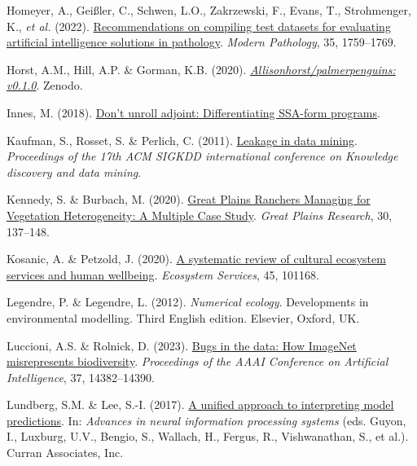 \documentclass[
  letterpaper,
]{scrbook}
\newlength{\cslhangindent}
\newenvironment{CSLReferences}[2] %
 {\begin{list}{}{%
  \setlength{\itemindent}{0pt}
  \setlength{\leftmargin}{0pt}
  \setlength{\parsep}{0pt}
  \ifodd #1
   \setlength{\leftmargin}{\cslhangindent}
   \setlength{\itemindent}{-1\cslhangindent}
  \fi
  \setlength{\itemsep}{#2\baselineskip}}}
 {\end{list}}
\begin{document}
\begin{CSLReferences}{1}{0}
Homeyer, A., Geißler, C., Schwen, L.O., Zakrzewski, F., Evans, T.,
Strohmenger, K., \emph{et al.} (2022).
\href{https://doi.org/10.1038/s41379-022-01147-y}{Recommendations on
compiling test datasets for evaluating artificial intelligence solutions
in pathology}. \emph{Modern Pathology}, 35, 1759--1769.

Horst, A.M., Hill, A.P. \& Gorman, K.B. (2020).
\emph{\href{https://doi.org/10.5281/ZENODO.3960218}{Allisonhorst/palmerpenguins:
v0.1.0}}. Zenodo.

Innes, M. (2018). \href{https://doi.org/10.48550/ARXIV.1810.07951}{Don't
unroll adjoint: Differentiating SSA-form programs}.

Kaufman, S., Rosset, S. \& Perlich, C. (2011).
\href{https://doi.org/10.1145/2020408.2020496}{Leakage in data mining}.
\emph{Proceedings of the 17th ACM SIGKDD international conference on
Knowledge discovery and data mining}.

Kennedy, S. \& Burbach, M. (2020).
\href{https://doi.org/10.1353/gpr.2020.0016}{Great Plains Ranchers
Managing for Vegetation Heterogeneity: A Multiple Case Study}.
\emph{Great Plains Research}, 30, 137--148.

Kosanic, A. \& Petzold, J. (2020).
\href{https://doi.org/10.1016/j.ecoser.2020.101168}{A systematic review
of cultural ecosystem services and human wellbeing}. \emph{Ecosystem
Services}, 45, 101168.

Legendre, P. \& Legendre, L. (2012). \emph{Numerical ecology}.
Developments in environmental modelling. Third English edition.
Elsevier, Oxford, UK.

Luccioni, A.S. \& Rolnick, D. (2023).
\href{https://doi.org/10.1609/aaai.v37i12.26682}{Bugs in the data: How
ImageNet misrepresents biodiversity}. \emph{Proceedings of the AAAI
Conference on Artificial Intelligence}, 37, 14382--14390.

Lundberg, S.M. \& Lee, S.-I. (2017).
\href{https://proceedings.neurips.cc/paper_files/paper/2017/file/8a20a8621978632d76c43dfd28b67767-Paper.pdf}{A
unified approach to interpreting model predictions}. In: \emph{Advances
in neural information processing systems} (eds. Guyon, I., Luxburg,
U.V., Bengio, S., Wallach, H., Fergus, R., Vishwanathan, S., et al.).
Curran Associates, Inc.


\end{CSLReferences}
\end{document}
